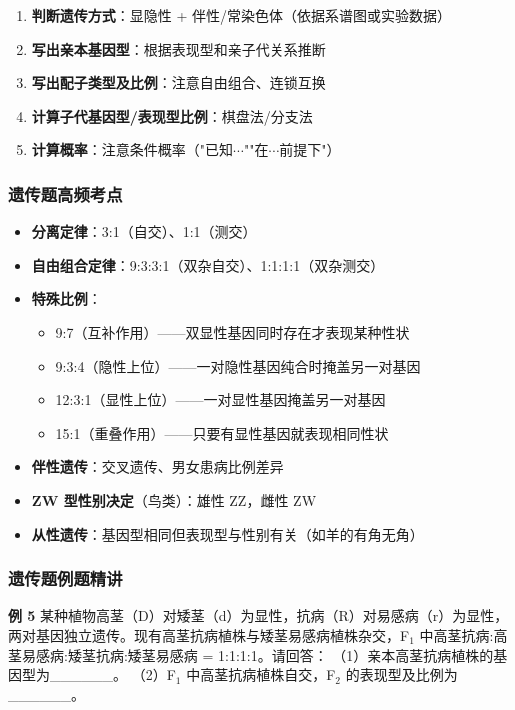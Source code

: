 \begin{enumerate}
  \item \textbf{判断遗传方式}：显隐性 + 伴性/常染色体（依据系谱图或实验数据）
  \item \textbf{写出亲本基因型}：根据表现型和亲子代关系推断
  \item \textbf{写出配子类型及比例}：注意自由组合、连锁互换
  \item \textbf{计算子代基因型/表现型比例}：棋盘法/分支法
  \item \textbf{计算概率}：注意条件概率（"已知$\cdots$""在$\cdots$前提下"）
\end{enumerate}

\subsubsection{遗传题高频考点}

\begin{itemize}
  \item \textbf{分离定律}：3:1（自交）、1:1（测交）
  \item \textbf{自由组合定律}：9:3:3:1（双杂自交）、1:1:1:1（双杂测交）
  \item \textbf{特殊比例}：
  \begin{itemize}
    \item 9:7（互补作用）——双显性基因同时存在才表现某种性状
    \item 9:3:4（隐性上位）——一对隐性基因纯合时掩盖另一对基因
    \item 12:3:1（显性上位）——一对显性基因掩盖另一对基因
    \item 15:1（重叠作用）——只要有显性基因就表现相同性状
  \end{itemize}
  \item \textbf{伴性遗传}：交叉遗传、男女患病比例差异
  \item \textbf{ZW 型性别决定}（鸟类）：雄性 ZZ，雌性 ZW
  \item \textbf{从性遗传}：基因型相同但表现型与性别有关（如羊的有角无角）
\end{itemize}

\subsubsection{遗传题例题精讲}

\textbf{例 5} 某种植物高茎（D）对矮茎（d）为显性，抗病（R）对易感病（r）为显性，两对基因独立遗传。现有高茎抗病植株与矮茎易感病植株杂交，F$_1$ 中高茎抗病:高茎易感病:矮茎抗病:矮茎易感病 = 1:1:1:1。请回答：
（1）亲本高茎抗病植株的基因型为\_\_\_\_\_\_。
（2）F$_1$ 中高茎抗病植株自交，F$_2$ 的表现型及比例为\_\_\_\_\_\_。

